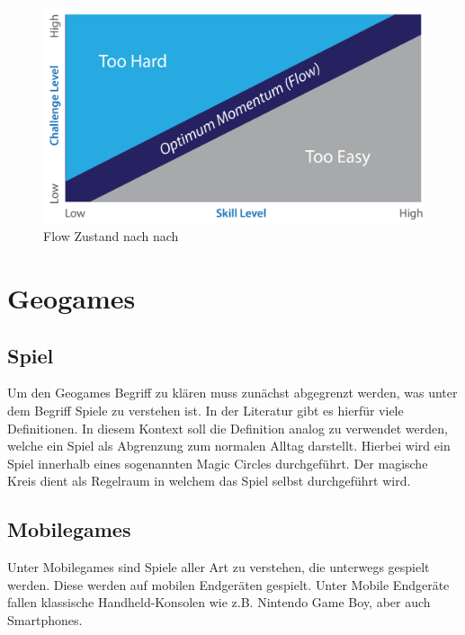 \begin{figure}[H]
\begin{center}
\includegraphics[width=120mm]{images/ch03_img02_flow.png}
\caption{Flow Zustand nach  nach \textcite{Csikszentmihalyi.1991}}
\label{img:ch03_img02_flow}
\end{center}
\end{figure}

\section{Geogames}
\label{ch3:s:Geogames}

\subsection*{Spiel}

Um den Geogames Begriff zu klären muss zunächst abgegrenzt werden, was unter dem Begriff Spiele zu verstehen ist. In der Literatur gibt es hierfür viele Definitionen.
In diesem Kontext soll die Definition analog zu \cite{Salen.2010} verwendet werden, welche ein Spiel als Abgrenzung zum normalen Alltag darstellt. Hierbei wird ein Spiel innerhalb eines sogenannten Magic Circles durchgeführt.
Der magische Kreis dient als Regelraum in welchem das Spiel selbst durchgeführt wird.


\subsection*{Mobilegames}

Unter Mobilegames sind Spiele aller Art zu verstehen, die unterwegs gespielt werden. Diese werden auf mobilen Endgeräten gespielt. \cite{Bell.2006} Unter Mobile Endgeräte fallen klassische Handheld-Konsolen wie z.B. Nintendo Game Boy, aber auch Smartphones.


